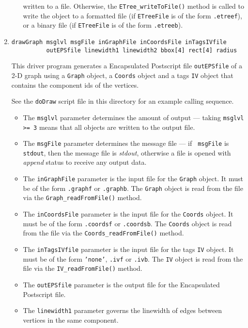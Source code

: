 \begin{enumerate}
\begin{itemize}
written to a file. 
Otherwise, the {\tt ETree\_writeToFile()} method is called to write
the object to 
a formatted file (if {\tt ETreeFile} is of the form {\tt *.etreef}),
or
a binary file (if {\tt ETreeFile} is of the form {\tt *.etreeb}).
\end{itemize}
\item
\begin{verbatim}
drawGraph msglvl msgFile inGraphFile inCoordsFile inTagsIVfile
          outEPSfile linewidth1 linewidth2 bbox[4] rect[4] radius
\end{verbatim}
This driver program generates a Encapsulated Postscript file 
{\tt outEPSfile} of a 2-D graph using a {\tt Graph} object,
a {\tt Coords} object and a tags {\tt IV} object that contains the
component ids of the vertices.
\par
See the {\tt doDraw} script file in this directory for an example
calling sequence.
\begin{itemize}
\item
The {\tt msglvl} parameter determines the amount of output ---
taking {\tt msglvl >= 3} means that all objects are written
to the output file.
\item
The {\tt msgFile} parameter determines the message file --- if {\tt
msgFile} is {\tt stdout}, then the message file is {\it stdout},
otherwise a file is opened with {\it append} status to receive any
output data.
\item
The {\tt inGraphFile} parameter is the input file for the {\tt Graph}
object. It must be of the form {\tt *.graphf} or {\tt *.graphb}.
The {\tt Graph} object is read from the file via the
{\tt Graph\_readFromFile()} method.
\item
The {\tt inCoordsFile} parameter is the input file for the {\tt Coords}
object. It must be of the form {\tt *.coordsf} or {\tt *.coordsb}.
The {\tt Coords} object is read from the file via the
{\tt Coords\_readFromFile()} method.
\item
The {\tt inTagsIVfile} parameter is the input file for the tags
{\tt IV} object. 
It must be of the form {\tt 'none'}, {\tt *.ivf} or {\tt *.ivb}.
The {\tt IV} object is read from the file via the
{\tt IV\_readFromFile()} method.
\item
The {\tt outEPSfile} parameter is the output file for the Encapsulated
Postscript file.
\item
The {\tt linewidth1} parameter governs the linewidth of edges
between vertices in the same component.

\end{itemize}
\end{enumerate}
